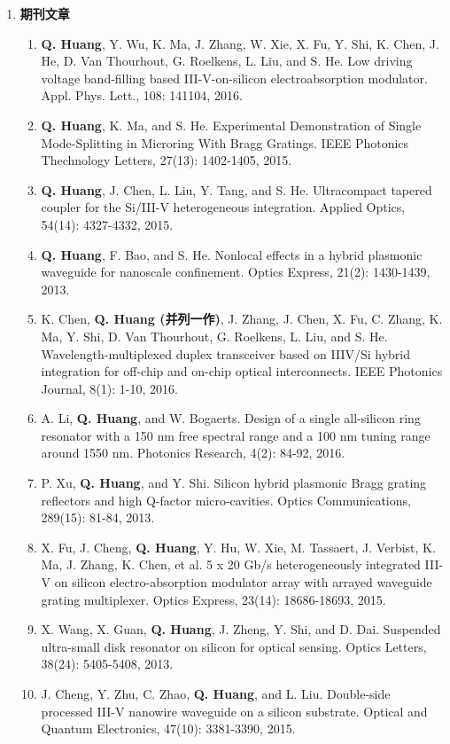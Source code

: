 \begin{publications}
\begin{enumerate}[]
	\item \textbf{期刊文章}
	\begin{enumerate}[1.]
		\item \textbf{Q. Huang}, Y. Wu, K. Ma, J. Zhang, W. Xie, X. Fu, Y. Shi, K. Chen, J. He, D. Van Thourhout, G. Roelkens, L. Liu, and S. He. Low driving voltage band-filling based III-V-on-silicon electroabsorption modulator. Appl. Phys. Lett., 108: 141104, 2016.
		\item \textbf{Q. Huang}, K. Ma, and S. He. Experimental Demonstration of Single Mode-Splitting in Microring With Bragg Gratings. IEEE Photonics Thechnology Letters, 27(13): 1402-1405, 2015.
		\item \textbf{Q. Huang}, J. Chen, L. Liu, Y. Tang, and S. He. Ultracompact tapered coupler for the Si/III-V heterogeneous integration. Applied Optics, 54(14): 4327-4332, 2015.
		\item \textbf{Q. Huang}, F. Bao, and S. He. Nonlocal effects in a hybrid plasmonic waveguide for nanoscale confinement. Optics Express, 21(2): 1430-1439, 2013.
		\item K. Chen, \textbf{Q. Huang (并列一作)}, J. Zhang, J. Chen, X. Fu, C. Zhang, K. Ma, Y. Shi, D. Van Thourhout, G. Roelkens, L. Liu, and S. He. Wavelength-multiplexed duplex transceiver based on IIIV/Si hybrid integration for off-chip 
		and on-chip optical interconnects. IEEE Photonics Journal, 8(1): 1-10, 2016. 		
		\item A. Li, \textbf{Q. Huang}, and W. Bogaerts. Design of a single all-silicon ring resonator with a 150 nm free spectral range and a 100 nm tuning range around 1550 nm. Photonics Research, 4(2): 84-92, 2016.
		\item P. Xu, \textbf{Q. Huang}, and Y. Shi. Silicon hybrid plasmonic Bragg grating reflectors and high Q-factor micro-cavities. Optics Communications, 289(15): 81-84, 2013.		
		\item X. Fu, J. Cheng, \textbf{Q. Huang}, Y. Hu, W. Xie, M. Tassaert, J. Verbist, K. Ma, J. Zhang, K. Chen, et al. 5 x 20 Gb/s heterogeneously integrated III-V on silicon electro-absorption modulator array with arrayed waveguide grating multiplexer. Optics Express, 23(14): 18686-18693, 2015.
		\item X. Wang, X. Guan,\textbf{ Q. Huang}, J. Zheng, Y. Shi, and D. Dai. Suspended ultra-small disk resonator on silicon for optical sensing. Optics Letters, 38(24): 5405-5408, 2013.
		\item J. Cheng, Y. Zhu, C. Zhao,\textbf{ Q. Huang}, and L. Liu. Double-side processed III-V nanowire waveguide on a silicon substrate. Optical and Quantum Electronics, 47(10): 3381-3390, 2015.

\end{enumerate}
\end{enumerate}
\end{publications}
